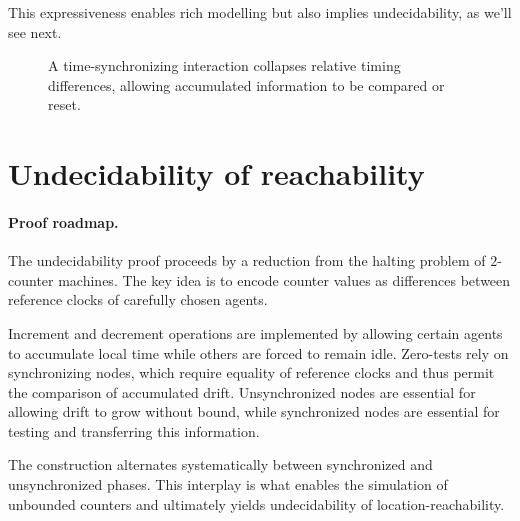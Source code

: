 This expressiveness enables rich modelling but also implies undecidability, as we'll see next.

\begin{figure}[t]
\centering
{}
\caption{A time-synchronizing interaction collapses relative timing differences,
allowing accumulated information to be compared or reset.}
\label{fig:selective-sync}
\end{figure}

\section{Undecidability of reachability}
\label{sec:ltn-undec}

\paragraph{Proof roadmap.}
The undecidability proof proceeds by a reduction from the halting problem of
$2$-counter machines.  The key idea is to encode counter values as differences
between reference clocks of carefully chosen agents.

Increment and decrement operations are implemented by allowing certain agents to
accumulate local time while others are forced to remain idle.  Zero-tests rely on
synchronizing nodes, which require equality of reference clocks and thus permit
the comparison of accumulated drift.  Unsynchronized nodes are essential for
allowing drift to grow without bound, while synchronized nodes are essential for
testing and transferring this information.

The construction alternates systematically between synchronized and
unsynchronized phases.  This interplay is what enables the simulation of
unbounded counters and ultimately yields undecidability of
location-reachability.

